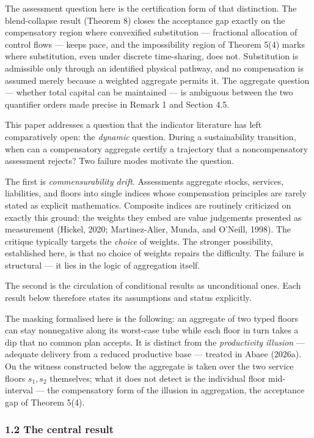 \documentclass[11pt]{article}
\begin{document}
The assessment question here is the certification form of that
distinction. The blend-collapse result (Theorem 8) closes the acceptance
gap exactly on the compensatory region where convexified substitution
--- fractional allocation of control flows --- keeps pace, and the
impossibility region of Theorem 5(4) marks where substitution, even
under discrete time-sharing, does not. Substitution is admissible only
through an identified physical pathway, and no compensation is assumed
merely because a weighted aggregate permits it. The aggregate question --- whether total capital can be maintained --- is ambiguous between the two quantifier orders made precise in Remark 1 and Section 4.5.

This paper addresses a question that the indicator literature has left
comparatively open: the \emph{dynamic} question. During a sustainability
transition, when can a compensatory aggregate certify a trajectory that
a noncompensatory assessment rejects? Two failure modes motivate the
question.

The first is \emph{commensurability drift}. Assessments aggregate
stocks, services, liabilities, and floors into single indices whose
compensation principles are rarely stated as explicit mathematics.
Composite indices are routinely criticized on exactly this ground: the
weights they embed are value judgements presented as measurement
(Hickel, 2020; Martinez-Alier, Munda, and O'Neill, 1998). The critique
typically targets the \emph{choice} of weights. The stronger possibility, established here, is that no choice of weights repairs the difficulty. The failure is structural --- it lies in
the logic of aggregation itself.

The second is the circulation of conditional results as unconditional ones. Each result below therefore states its assumptions and status explicitly.

The masking formalised here is the following: an aggregate of two typed
floors can stay nonnegative along its worst-case tube while each floor
in turn takes a dip that no common plan accepts. It is distinct from the \emph{productivity illusion} --- adequate delivery from a reduced productive base --- treated in Abaee (2026a). On the
witness constructed below the aggregate is taken over the two service
floors \(s_1, s_2\) themselves; what it does not detect is the individual floor mid-interval --- the compensatory form of the illusion in aggregation, the acceptance gap of Theorem 5(4).

\subsubsection{1.2 The central result}\label{the-central-result}
\end{document}
